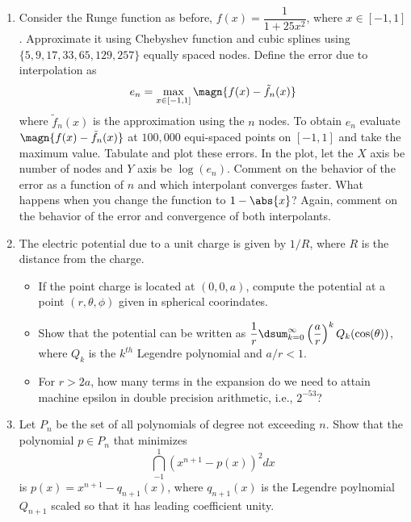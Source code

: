 \documentclass{article}
\begin{document}
	\begin{enumerate}
		\item
		Consider the Runge function as before, $f(x) = \dfrac1{1+25x^2}$, where $x \in [-1,1]$. Approximate it using Chebyshev function and cubic splines using $\{5,9,17,33,65,129,257\}$ equally spaced nodes. Define the error due to interpolation as $$e_n = \max_{x \in [-1,1]}\magn{f(x)-\tilde{f}_n(x)}$$ where $\tilde{f}_n(x)$ is the approximation using the $n$ nodes. To obtain $e_n$ evaluate $\magn{f(x)-\tilde{f}_n(x)}$ at $100,000$ equi-spaced points on $[-1,1]$ and take the maximum value. Tabulate and plot these errors. In the plot, let the $X$ axis be number of nodes and $Y$ axis be $\log(e_n)$. Comment on the behavior of the error as a function of $n$ and which interpolant converges faster. What happens when you change the function to $1-\abs{x}$? Again, comment on the behavior of the error and convergence of both interpolants.
		\item
		The electric potential due to a unit charge is given by $1/R$, where $R$ is the distance from the charge.
		\begin{itemize}
			\item
			If the point charge is located at $(0,0,a)$, compute the potential at a point $(r,\theta,\phi)$ given in spherical coorindates.
			\item
			Show that the potential can be written as $\dfrac1r \dsum_{k=0}^{\infty} \left(\dfrac{a}r\right)^k Q_k(\cos(\theta))$, where $Q_k$ is the $k^{th}$ Legendre polynomial and $a/r < 1$.
			\item
			For $r>2a$, how many terms in the expansion do we need to attain machine epsilon in double precision arithmetic, i.e., $2^{-53}$?
		\end{itemize}
		\item
		Let $P_n$ be the set of all polynomials of degree not exceeding $n$. Show that the polynomial $p \in P_n$ that minimizes
		$$\dint_{-1}^1 \left(x^{n+1}-p(x)\right)^2 dx$$
		is $p(x) = x^{n+1}-q_{n+1}(x)$, where $q_{n+1}(x)$ is the Legendre poylnomial $Q_{n+1}$ scaled so that it has leading coefficient unity.
	\end{enumerate}
\end{document}

